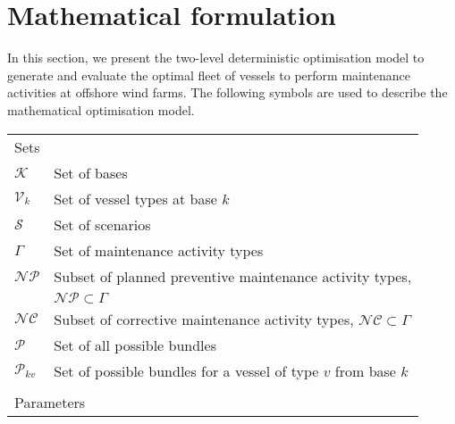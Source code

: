 \section{Mathematical formulation}
\label{sec:mathematicalformulationICCS}

In this section, we present the two-level deterministic optimisation model to generate and evaluate the optimal fleet of vessels to perform maintenance activities at offshore wind farms. The following symbols are used to describe the mathematical optimisation model.



\begin{tabular}{ll}
	\multicolumn{2}{l}{Sets}\\
	$\mathcal{K}$ 				& 	Set of bases \\
	$\mathcal{V}_k$ 				& 	Set of vessel types at base $k$ \\
	$\mathcal{S}$ 				& 	Set of scenarios \\	
	$\Gamma$ 					&	Set of maintenance activity types \\
	$\mathcal{NP}$				&	Subset of planned preventive maintenance activity types, \\
	                            & $\mathcal{NP}\subset\Gamma$ \\
	$\mathcal{NC}$				&	Subset of corrective maintenance activity types, $\mathcal{NC}\subset\Gamma$ \\
	$\mathcal{P}$				&	Set of all possible bundles\\
	$\mathcal{P}_{kv}$			&	Set of possible bundles for a vessel of type $v$ from base $k$\\



	\\
  \multicolumn{2}{l}{Parameters}\\
  

\end{tabular}
